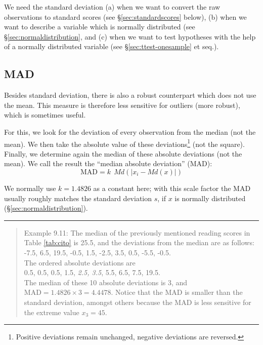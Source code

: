 \documentclass[
]{book}
\begin{document}
We need the standard deviation
(a) when we want to convert the raw
observations to standard scores (see §\ref{sec:standardscores} below),
(b) when we want to describe a variable
which is normally distributed (see §\ref{sec:normaldistribution}, and
(c) when we want to test hypotheses with the help of a normally distributed variable (see
§\ref{sec:ttest-onesample} et seq.).

\subsection{MAD}\label{mad}

Besides standard deviation, there is also a robust counterpart
which does not use the mean. This measure is therefore less
sensitive for outliers (more robust), which is sometimes useful.

For this, we look for the deviation of every observation from
the median (not the mean). We then take the absolute value
of these deviations\footnote{Positive deviations remain unchanged, negative deviations are reversed.} (not the square). Finally, we
determine again the median of these absolute deviations (not the mean).
We call the result the ``median absolute deviation'' (MAD):
\begin{equation}
  \textrm{MAD} = k ~~ Md ( |x_i - Md(x) |)
  \label{eq:MAD}
\end{equation}

We normally use \(k=1.4826\) as a constant here; with this scale factor the MAD
usually roughly matches the standard deviation \(s\), if \(x\) is
normally distributed (§\ref{sec:normaldistribution}).

\begin{center}\rule{0.5\linewidth}{0.5pt}\end{center}

\begin{quote}
Example 9.11:
The median of the previously mentioned reading scores in
Table \ref{tab:cito} is
25.5, and the deviations from the median are as follows:\\
-7.5, 6.5, 19.5, -0.5, 1.5, -2.5, 3.5, 0.5, -5.5, -0.5.\\
The ordered absolute deviations are\\
0.5, 0.5, 0.5, 1.5, \emph{2.5, 3.5}, 5.5, 6.5, 7.5, 19.5.\\
The median of these 10 absolute deviations is 3, and
\(\textrm{MAD} = 1.4826 \times 3 = 4.4478\). Notice that the MAD
is smaller than the standard deviation, amongst others because the MAD is less sensitive
for the extreme value \(x_3=45\).
\end{quote}
\end{document}
